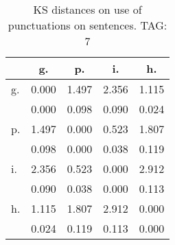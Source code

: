 \begin{table}[h!]
\begin{center}
\begin{tabular}{| l | c | c | c | c |}\hline
 & g. & p. & i. & h. \\\hline
g. & 0.000  & 1.497  & 2.356  & 1.115 \\\hline
 & 0.000  & 0.098  & 0.090  & 0.024 \\\hline
p. & 1.497  & 0.000  & 0.523  & 1.807 \\\hline
 & 0.098  & 0.000  & 0.038  & 0.119 \\\hline
i. & 2.356  & 0.523  & 0.000  & 2.912 \\\hline
 & 0.090  & 0.038  & 0.000  & 0.113 \\\hline
h. & 1.115  & 1.807  & 2.912  & 0.000 \\\hline
 & 0.024  & 0.119  & 0.113  & 0.000 \\\hline
\end{tabular}
\caption{KS distances on use of punctuations on sentences. TAG: 7}
\end{center}
\end{table}